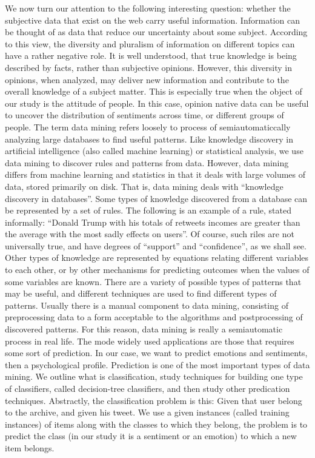 \documentclass{acmtog} %
\begin{document}
We now turn our attention to the following interesting question: whether the subjective data that exist on the web carry useful information. Information can be thought of as data that reduce our uncertainty about some subject. According to this view, the diversity and pluralism of information on different topics can have a rather negative role. It is well understood, that true knowledge is being described by facts, rather than subjective opinions. However, this diversity in opinions, when analyzed, may deliver new information and contribute to the overall knowledge of a subject matter. This is especially true when the object of our study is the attitude of people. In this case, opinion native data can be useful to uncover the distribution of sentiments across time, or different groups of people.
The term data mining refers loosely to process of semiautomaticcally analyzing large databases to find useful patterns. Like knowledge discovery in artificial intelligence (also called machine learning) or statistical analysis, we use data mining to discover rules and patterns from data. However, data mining differs from machine learning and statistics in that it deals with large volumes of data, stored primarily on disk. That is, data mining deals with “knowledge discovery in databases”. Some types of knowledge discovered from a database can be represented by a set of rules. The following is an example of a rule, stated informally: “Donald Trump with his totals of retweets incomes are greater than the average with the most sadly effects on users”. Of course, such riles are not universally true, and have degrees of “support” and “confidence”, as we shall see. Other types of knowledge are represented by equations relating different variables to each other, or by other mechanisms for predicting outcomes when the values of some variables are known. There are a variety of possible types of patterns that may be useful, and different techniques are used to find different types of patterns. Usually there is a manual component to data mining, consisting of preprocessing data to a form acceptable to the algorithms and postprocessing of discovered patterns. For this reason, data mining is really a semiautomatic process in real life. The mode widely used applications are those that requires some sort of prediction. In our case, we want to predict emotions and sentiments, then a psychological profile. Prediction is one of the most important types of data mining. We outline what is classification, study techniques for building one type of classifiers, called decision-tree classifiers, and then study other predication techniques. Abstractly, the classification problem is this: Given that user belong to the archive, and given his tweet. We use a given instances (called training instances) of items along with the classes to which they belong, the problem is to predict the class (in our study it is a sentiment or an emotion) to which a new item belongs.
\end{document}
